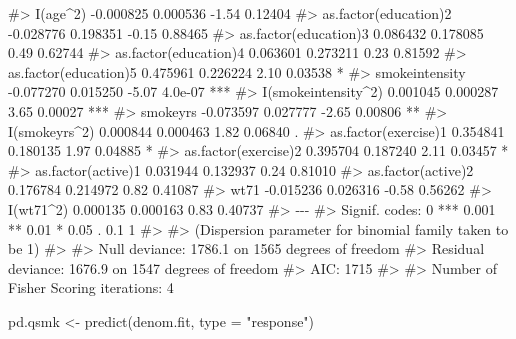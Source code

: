\documentclass[
  10pt,
  a4paper,
]{book}
\newenvironment{Shaded}{\begin{snugshade}}{\end{snugshade}}
\newcommand{\AttributeTok}[1]{\textcolor[rgb]{0.40,0.45,0.13}{#1}}
\newcommand{\CommentTok}[1]{\textcolor[rgb]{0.37,0.37,0.37}{#1}}
\newcommand{\FunctionTok}[1]{\textcolor[rgb]{0.28,0.35,0.67}{#1}}
\newcommand{\NormalTok}[1]{\textcolor[rgb]{0.00,0.46,0.62}{#1}}
\newcommand{\OtherTok}[1]{\textcolor[rgb]{0.00,0.46,0.62}{#1}}
\newcommand{\StringTok}[1]{\textcolor[rgb]{0.13,0.47,0.30}{#1}}
\begin{document}
\begin{Shaded}
\begin{Highlighting}[]
\CommentTok{\#\textgreater{} I(age\^{}2)              {-}0.000825   0.000536   {-}1.54  0.12404    }
\CommentTok{\#\textgreater{} as.factor(education)2 {-}0.028776   0.198351   {-}0.15  0.88465    }
\CommentTok{\#\textgreater{} as.factor(education)3  0.086432   0.178085    0.49  0.62744    }
\CommentTok{\#\textgreater{} as.factor(education)4  0.063601   0.273211    0.23  0.81592    }
\CommentTok{\#\textgreater{} as.factor(education)5  0.475961   0.226224    2.10  0.03538 *  }
\CommentTok{\#\textgreater{} smokeintensity        {-}0.077270   0.015250   {-}5.07  4.0e{-}07 ***}
\CommentTok{\#\textgreater{} I(smokeintensity\^{}2)    0.001045   0.000287    3.65  0.00027 ***}
\CommentTok{\#\textgreater{} smokeyrs              {-}0.073597   0.027777   {-}2.65  0.00806 ** }
\CommentTok{\#\textgreater{} I(smokeyrs\^{}2)          0.000844   0.000463    1.82  0.06840 .  }
\CommentTok{\#\textgreater{} as.factor(exercise)1   0.354841   0.180135    1.97  0.04885 *  }
\CommentTok{\#\textgreater{} as.factor(exercise)2   0.395704   0.187240    2.11  0.03457 *  }
\CommentTok{\#\textgreater{} as.factor(active)1     0.031944   0.132937    0.24  0.81010    }
\CommentTok{\#\textgreater{} as.factor(active)2     0.176784   0.214972    0.82  0.41087    }
\CommentTok{\#\textgreater{} wt71                  {-}0.015236   0.026316   {-}0.58  0.56262    }
\CommentTok{\#\textgreater{} I(wt71\^{}2)              0.000135   0.000163    0.83  0.40737    }
\CommentTok{\#\textgreater{} {-}{-}{-}}
\CommentTok{\#\textgreater{} Signif. codes:  0 \textquotesingle{}***\textquotesingle{} 0.001 \textquotesingle{}**\textquotesingle{} 0.01 \textquotesingle{}*\textquotesingle{} 0.05 \textquotesingle{}.\textquotesingle{} 0.1 \textquotesingle{} \textquotesingle{} 1}
\CommentTok{\#\textgreater{} }
\CommentTok{\#\textgreater{} (Dispersion parameter for binomial family taken to be 1)}
\CommentTok{\#\textgreater{} }
\CommentTok{\#\textgreater{}     Null deviance: 1786.1  on 1565  degrees of freedom}
\CommentTok{\#\textgreater{} Residual deviance: 1676.9  on 1547  degrees of freedom}
\CommentTok{\#\textgreater{} AIC: 1715}
\CommentTok{\#\textgreater{} }
\CommentTok{\#\textgreater{} Number of Fisher Scoring iterations: 4}

\NormalTok{pd.qsmk }\OtherTok{\textless{}{-}} \FunctionTok{predict}\NormalTok{(denom.fit, }\AttributeTok{type =} \StringTok{"response"}\NormalTok{)}


\end{Highlighting}
\end{Shaded}
\end{document}
